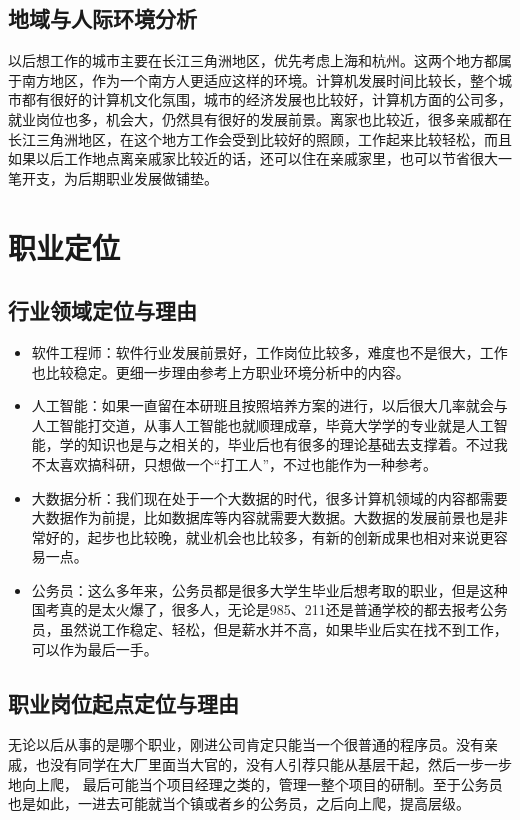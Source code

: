 \documentclass{article}
\begin{document}
\subsection{地域与人际环境分析}
以后想工作的城市主要在长江三角洲地区，优先考虑上海和杭州。这两个地方都属于南方地区，作为一个南方人更适应这样的环境。计算机发展时间比较长，整个城市都有很好的计算机文化氛围，城市的经济发展也比较好，计算机方面的公司多，就业岗位也多，机会大，仍然具有很好的发展前景。离家也比较近，很多亲戚都在长江三角洲地区，在这个地方工作会受到比较好的照顾，工作起来比较轻松，而且如果以后工作地点离亲戚家比较近的话，还可以住在亲戚家里，也可以节省很大一笔开支，为后期职业发展做铺垫。

\section{职业定位}
\subsection{行业领域定位与理由}
\begin{itemize}
	\item 软件工程师：软件行业发展前景好，工作岗位比较多，难度也不是很大，工作也比较稳定。更细一步理由参考上方职业环境分析中的内容。
	\item 人工智能：如果一直留在本研班且按照培养方案的进行，以后很大几率就会与人工智能打交道，从事人工智能也就顺理成章，毕竟大学学的专业就是人工智能，学的知识也是与之相关的，毕业后也有很多的理论基础去支撑着。不过我不太喜欢搞科研，只想做一个“打工人”，不过也能作为一种参考。
	\item 大数据分析：我们现在处于一个大数据的时代，很多计算机领域的内容都需要大数据作为前提，比如数据库等内容就需要大数据。大数据的发展前景也是非常好的，起步也比较晚，就业机会也比较多，有新的创新成果也相对来说更容易一点。
	\item 公务员：这么多年来，公务员都是很多大学生毕业后想考取的职业，但是这种国考真的是太火爆了，很多人，无论是985、211还是普通学校的都去报考公务员，虽然说工作稳定、轻松，但是薪水并不高，如果毕业后实在找不到工作，可以作为最后一手。
\end{itemize}
\subsection{职业岗位起点定位与理由}
	无论以后从事的是哪个职业，刚进公司肯定只能当一个很普通的程序员。没有亲戚，也没有同学在大厂里面当大官的，没有人引荐只能从基层干起，然后一步一步地向上爬， 最后可能当个项目经理之类的，管理一整个项目的研制。至于公务员也是如此，一进去可能就当个镇或者乡的公务员，之后向上爬，提高层级。
\end{document}
